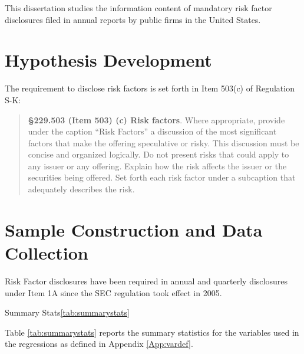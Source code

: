 This dissertation studies the information content of mandatory risk factor disclosures filed in annual reports by public firms in the United States.




\section{Hypothesis Development}\label{sec:supply_hypothesis}

The requirement to disclose risk factors is set forth in Item 503(c) of Regulation S-K:
\begin{quote}\singlespacing
	\textbf{\S 229.503 (Item 503) (c) Risk factors}. 
	Where appropriate, provide under the caption ``Risk Factors'' a discussion of the most significant factors that make the offering speculative or risky. 
	This discussion must be concise and organized logically. 
	Do not present risks that could apply to any issuer or any offering. 
	Explain how the risk affects the issuer or the securities being offered. 
	Set forth each risk factor under a subcaption that adequately describes the risk.
\end{quote}



\section{Sample Construction and Data Collection}\label{sec:sample}

Risk Factor disclosures have been required in annual and quarterly disclosures under Item 1A since the SEC regulation took effect in 2005.


\begin{thesistable}{Summary Stats}{\ref{tab:summarystats}}
	\label{tab:summarystats}
	
	Table \ref{tab:summarystats} reports the summary statistics for the variables used in the regressions as defined in Appendix \ref{App:vardef}.
	
	\startdata
	
\end{thesistable}


